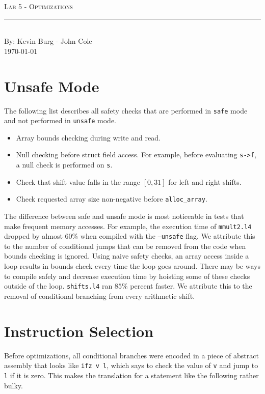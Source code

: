\documentclass[aps,letterpaper,11pt]{revtex4}
\newcommand{\labtitle}{Lab 5 - Optimizations}
\newcommand{\authorname}{Kevin Burg - John Cole}
\begin{document}

\begin{titlepage}
\begin{center}
{\Large \textsc{\labtitle} \\ \vspace{4pt}} 
\rule[13pt]{\textwidth}{1pt} \\ \vspace{150pt}
{\large By: \authorname \\ \vspace{10pt}
\today}
\end{center}
\end{titlepage}


\section{Unsafe Mode}

The following list describes all safety checks that are performed in \texttt{safe} mode and not performed in
\texttt{unsafe} mode.

\begin{itemize}
\item Array bounds checking during write and read.
\item Null checking before struct field access. For example, before evaluating \texttt{s->f}, a null check
is performed on \texttt{s}.
\item Check that shift value falls in the range $[0, 31]$ for left and right shifts.
\item Check requested array size non-negative before \texttt{alloc\_array}.
\end{itemize}

The difference between safe and unsafe mode is most noticeable in tests that make frequent memory accesses.
For example, the execution time of \texttt{mmult2.l4} dropped by almost $60\%$ when compiled with the
\texttt{--unsafe} flag. We attribute this to the number of conditional jumps that can be removed from the
code when bounds checking is ignored. Using naive safety checks, an array access inside a loop results in
bounds check every time the loop goes around. There may be ways to compile safely and decrease execution
time by hoisting some of these checks outside of the loop. \texttt{shifts.l4} ran $85\%$ percent faster.
We attribute this to the removal of conditional branching from every arithmetic shift.

\section{Instruction Selection}
Before optimizations, all conditional branches were encoded in a piece of abstract assembly that looks like
\texttt{ifz v l}, which says to check the value of \texttt{v} and jump to \texttt{l} if it is zero. This makes
the translation for a statement like the following rather bulky.
\end{document}
